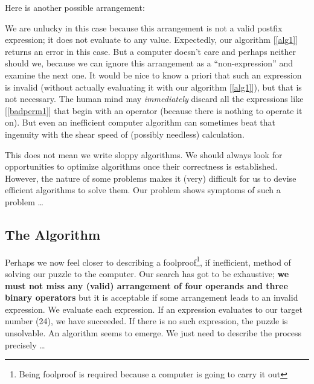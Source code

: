 \documentclass{resonance}
\newenvironment{arrangement}{\captionsetup{type=mytype}}{}
\begin{document}
Here is another possible arrangement:

\begin{arrangement}
\vspace{2mm}
\centering
{}
\label{badperm1}
\end{arrangement}

We are unlucky in this case because this arrangement is not a valid postfix expression; it does not evaluate to any value. Expectedly, our algorithm [\ref{alg1}] returns an error in this case. But a computer doesn't care and perhaps neither should we, because we can ignore this arrangement as a ``non-expression'' and examine the next one. It would be nice to know a priori that such an expression is invalid (without actually evaluating it with our algorithm [\ref{alg1}]), but that is not necessary. The human mind may \emph{immediately} discard all the expressions like [\ref{badperm1}] that begin with an operator (because there is nothing to operate it on). But even an inefficient computer algorithm can sometimes beat that ingenuity with the shear speed of (possibly needless) calculation. 

This does not mean we write sloppy algorithms. We should always look for opportunities to optimize algorithms once their correctness is established. However, the nature of some problems makes it (very) difficult for us to devise efficient algorithms to solve them. Our problem shows symptoms of such a problem \dots

\subsection{The Algorithm}
Perhaps we now feel closer to describing a foolproof\footnote{Being foolproof is required because a computer is going to carry it out}, if inefficient, method of solving our puzzle to the computer. Our search has got to be exhaustive; \textbf{we must not miss any (valid) arrangement of four operands and three binary operators} but it is acceptable if some arrangement leads to an invalid expression. We evaluate each expression. If an expression evaluates to our target number (24), we have succeeded. If there is no such expression, the puzzle is unsolvable. An algorithm seems to emerge. We just need to describe the process precisely \dots
\end{document}
